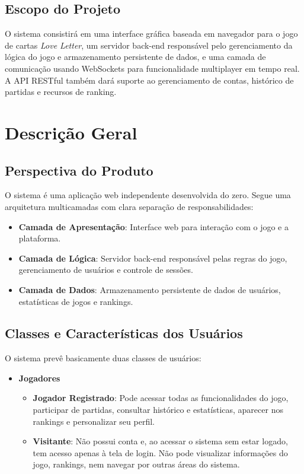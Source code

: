 \documentclass{scrreprt}
\begin{document}
\section{Escopo do Projeto}
O sistema consistirá em uma interface gráfica baseada em navegador para o jogo de cartas \textit{Love Letter}, um servidor back-end responsável pelo gerenciamento da lógica do jogo e armazenamento persistente de dados, e uma camada de comunicação usando WebSockets para funcionalidade multiplayer em tempo real. A API RESTful também dará suporte ao gerenciamento de contas, histórico de partidas e recursos de ranking.

\chapter{Descrição Geral}

\section{Perspectiva do Produto}
O sistema é uma aplicação web independente desenvolvida do zero. Segue uma arquitetura multicamadas com clara separação de responsabilidades:
\begin{itemize}
    \item \textbf{Camada de Apresentação}: Interface web para interação com o jogo e a plataforma.
    \item \textbf{Camada de Lógica}: Servidor back-end responsável pelas regras do jogo, gerenciamento de usuários e controle de sessões.
    \item \textbf{Camada de Dados}: Armazenamento persistente de dados de usuários, estatísticas de jogos e rankings.
\end{itemize}

\section{Classes e Características dos Usuários}

O sistema prevê basicamente duas classes de usuários:

\begin{itemize}
    \item \textbf{Jogadores}
    \begin{itemize}
        \item \textbf{Jogador Registrado}: Pode acessar todas as funcionalidades do jogo, participar de partidas, consultar histórico e estatísticas, aparecer nos rankings e personalizar seu perfil.
        \item \textbf{Visitante}: Não possui conta e, ao acessar o sistema sem estar logado, tem acesso apenas à tela de login. Não pode visualizar informações do jogo, rankings, nem navegar por outras áreas do sistema.
    \end{itemize}
\end{itemize}
\end{document}
